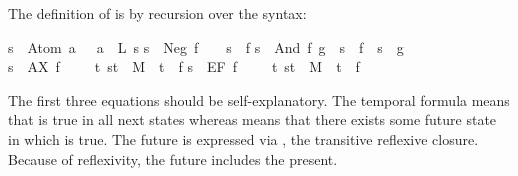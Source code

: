 \begin{isabellebody}
\begin{isamarkuptext}
The definition of \isa{{\isasymTurnstile}} is by recursion over the syntax:%
\end{isamarkuptext}%
\isanewline
{\isachardoublequote}s\ {\isasymTurnstile}\ Atom\ a\ \ {\isacharequal}\ {\isacharparenleft}a\ {\isasymin}\ L\ s{\isacharparenright}{\isachardoublequote}\isanewline
{\isachardoublequote}s\ {\isasymTurnstile}\ Neg\ f\ \ \ {\isacharequal}\ {\isacharparenleft}{\isasymnot}{\isacharparenleft}s\ {\isasymTurnstile}\ f{\isacharparenright}{\isacharparenright}{\isachardoublequote}\isanewline
{\isachardoublequote}s\ {\isasymTurnstile}\ And\ f\ g\ {\isacharequal}\ {\isacharparenleft}s\ {\isasymTurnstile}\ f\ {\isasymand}\ s\ {\isasymTurnstile}\ g{\isacharparenright}{\isachardoublequote}\isanewline
{\isachardoublequote}s\ {\isasymTurnstile}\ AX\ f\ \ \ \ {\isacharequal}\ {\isacharparenleft}{\isasymforall}t{\isachardot}\ {\isacharparenleft}s{\isacharcomma}t{\isacharparenright}\ {\isasymin}\ M\ {\isasymlongrightarrow}\ t\ {\isasymTurnstile}\ f{\isacharparenright}{\isachardoublequote}\isanewline
{\isachardoublequote}s\ {\isasymTurnstile}\ EF\ f\ \ \ \ {\isacharequal}\ {\isacharparenleft}{\isasymexists}t{\isachardot}\ {\isacharparenleft}s{\isacharcomma}t{\isacharparenright}\ {\isasymin}\ M{\isacharcircum}{\isacharasterisk}\ {\isasymand}\ t\ {\isasymTurnstile}\ f{\isacharparenright}{\isachardoublequote}%
\begin{isamarkuptext}%
\noindent
The first three equations should be self-explanatory. The temporal formula
 means that  is true in all next states whereas
 means that there exists some future state in which  is
true. The future is expressed via \isa{{\isacharcircum}{\isacharasterisk}}, the transitive reflexive
closure. Because of reflexivity, the future includes the present.


\end{isamarkuptext}
\end{isabellebody}
